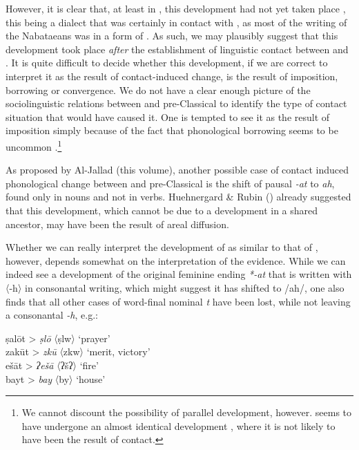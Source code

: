\documentclass[output=paper]{langsci/langscibook}
\begin{document}
However, it is clear that, at least in  , this development had not yet taken place \citep[91--93]{Diem1980}, this being a dialect that was certainly in contact with , as most of the writing of the Nabataeans was in a form of . As such, we may plausibly suggest that this development took place \textit{after} the establishment of linguistic contact between  and . It is quite difficult to decide whether this development, if we are correct to interpret it as the result of contact-induced change, is the result of {imposition}, borrowing or {convergence}. We do not have a clear enough picture of the sociolinguistic relations between  and pre-Classical  to identify the type of contact situation that would have caused it. One is tempted to see it as the result of {imposition} simply because of the fact that phonological borrowing seems to be uncommon \citep[526]{Lucas2015}.\footnote{We cannot discount the possibility of parallel development, however.  seems to have undergone an almost identical development \citep[196]{Huehnergard1997}, where it is not likely to have been the result of contact.} 

As proposed by Al-Jallad (this volume), another possible case of contact induced phonological change between  and pre-Classical  is the shift of pausal \textit{-at} to \textit{ah}, found only in nouns and not in verbs. Huehnergard \& Rubin (\citeyear[267--268]{HuehnergardRubin2011}) already suggested that this development, which cannot be due to a development in a shared ancestor, may have been the result of areal {diffusion}.

Whether we can really interpret the development of  as similar to that of , however, depends somewhat on the interpretation of the  evidence. While we can indeed see a development of the original  feminine ending \textit{*-at} that is written with 〈-h〉 in consonantal writing, which might suggest it has shifted to /ah/, one also finds that all other cases of word-final nominal \textit{t} have been lost, while not leaving a consonantal \textit{-h}, e.g.: 

\ea
\ea *ṣalōt > \textit{ṣlō} 〈ṣlw〉 ‘prayer’\\
\ex *zakūt > \textit{zkū} 〈zkw〉 ‘merit, victory’\\
\ex *ešāt > \textit{ʔešā} 〈ʔšʔ〉 ‘fire’\\
\ex *bayt > \textit{bay}  〈by〉 ‘house’
\z
\z
\end{document}
